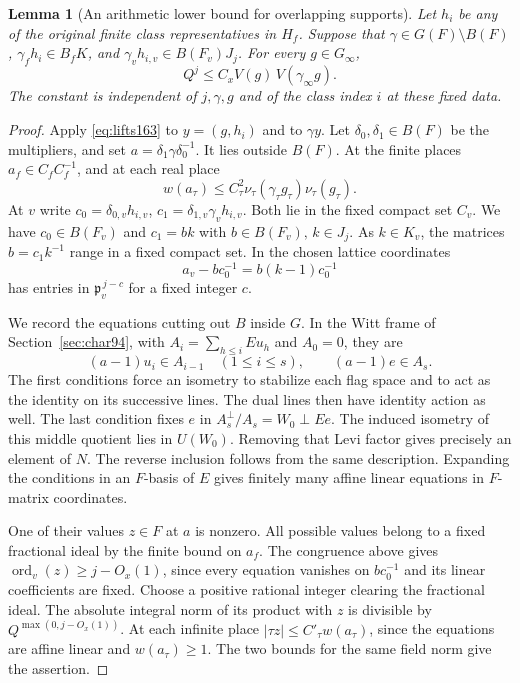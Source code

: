 \documentclass[a4paper,11pt]{article}
\newtheorem{lemma}[proposition]{Lemma}
\theoremstyle{definition}
\theoremstyle{remark}
\numberwithin{equation}{section}
\begin{document}
\begin{lemma}[An arithmetic lower bound for overlapping supports]
\label{lem:deep163}
Let \(h_i\) be any of the original finite class representatives
in \(H_f\). Suppose that \(\gamma\in G(F)\setminus B(F)\),
\(\gamma_f h_i\in B_fK\), and
\(\gamma_v h_{i,v}\in B(F_v)J_j\). For every \(g\in G_\infty\),
\[
                 Q^j\le C_x V(g)\,V(\gamma_\infty g).
\]
The constant is independent of \(j,\gamma,g\) and of the class
index \(i\) at these fixed data.
\end{lemma}
\begin{proof}
Apply \eqref{eq:lifts163} to \(y=(g,h_i)\) and to \(\gamma y\).
Let \(\delta_0,\delta_1\in B(F)\) be the multipliers, and set
\(a=\delta_1\gamma\delta_0^{-1}\). It lies outside \(B(F)\).
At the finite places \(a_f\in C_fC_f^{-1}\), and at each
real place
\[
        w(a_\tau)\le C_\tau^2
                     \nu_\tau(\gamma_\tau g_\tau)\nu_\tau(g_\tau).
\]
At \(v\) write \(c_0=\delta_{0,v}h_{i,v}\),
\(c_1=\delta_{1,v}\gamma_v h_{i,v}\). Both lie in the fixed
compact set \(C_v\). We have \(c_0\in B(F_v)\) and
\(c_1=b k\) with \(b\in B(F_v),\, k\in J_j\).
As \(k\in K_v\), the matrices \(b=c_1 k^{-1}\) range in a
fixed compact set. In the chosen lattice coordinates
\[
              a_v-bc_0^{-1}=b(k-1)c_0^{-1}
\]
has entries in \(\mathfrak p_v^{\,j-c}\) for a fixed integer \(c\).

We record the equations cutting out \(B\) inside \(G\).
In the Witt frame of Section~\ref{sec:char94}, with
\(A_i=\sum_{h\le i}Eu_h\) and \(A_0=0\), they are
\[
 (a-1)u_i\in A_{i-1}\quad(1\le i\le s),\qquad
                      (a-1)e\in A_s .
\]
The first conditions force an isometry to stabilize each flag
space and to act as the identity on its successive lines.
The dual lines then have identity action as well. The last
condition fixes \(e\) in \(A_s^\perp/A_s=W_0\perp Ee\).
The induced isometry of this middle quotient lies in \(U(W_0)\).
Removing that Levi factor gives precisely an element of \(N\).
The reverse inclusion follows from the same description.
Expanding the conditions in an \(F\)-basis of \(E\) gives
finitely many affine linear equations in \(F\)-matrix
coordinates.

One of their values \(z\in F\) at \(a\) is nonzero. All possible
values belong to a fixed fractional ideal by the finite bound on
\(a_f\). The congruence above gives
\(\operatorname{ord}_v(z)\ge j-O_x(1)\), since every equation
vanishes on \(bc_0^{-1}\) and its linear coefficients are fixed.
Choose a positive rational integer clearing the fractional
ideal. The absolute integral norm of its product with \(z\)
is divisible by \(Q^{\max(0,j-O_x(1))}\). At each infinite
place \(|\tau z|\le C'_\tau w(a_\tau)\), since the equations
are affine linear and \(w(a_\tau)\ge1\). The two bounds for
the same field norm give the assertion.
\end{proof}
\end{document}

